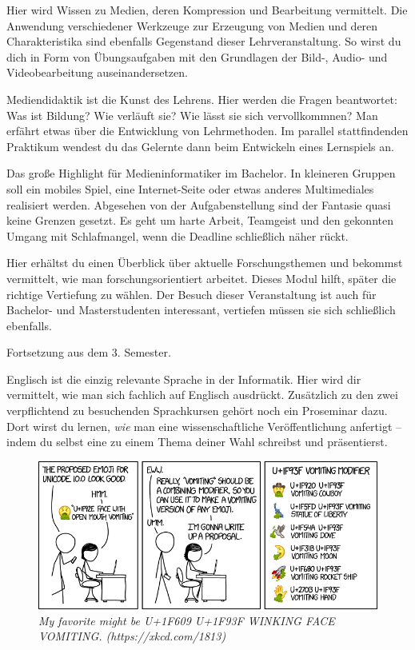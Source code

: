 Hier wird Wissen zu Medien, deren Kompression und Bearbeitung vermittelt.
Die Anwendung verschiedener Werkzeuge zur Erzeugung von Medien und deren Charakteristika sind ebenfalls Gegenstand dieser Lehrveranstaltung.
So wirst du dich in Form von Übungsaufgaben mit den Grundlagen der Bild-, Audio- und Videobearbeitung auseinandersetzen.

Mediendidaktik ist die \glqq Kunst des Lehrens\grqq.
Hier werden die Fragen beantwortet:
Was ist Bildung?
Wie verläuft sie?
Wie lässt sie sich vervollkommnen?
Man erfährt etwas über die Entwicklung von Lehrmethoden.
Im parallel stattfindenden Praktikum wendest du das Gelernte dann beim Entwickeln eines Lernspiels an.

Das große Highlight für Medieninformatiker im Bachelor.
In kleineren Gruppen soll ein mobiles Spiel, eine Internet-Seite oder etwas anderes Multimediales realisiert werden.
Abgesehen von der Aufgabenstellung sind der Fantasie quasi keine Grenzen gesetzt.
Es geht um harte Arbeit, Teamgeist und den gekonnten Umgang mit Schlafmangel, wenn die Deadline schließlich näher rückt.

Hier erhältst du einen Überblick über aktuelle Forschungsthemen und bekommst vermittelt, wie man forschungsorientiert arbeitet.
Dieses Modul hilft, später die richtige Vertiefung zu wählen. Der Besuch dieser Veranstaltung ist auch für Bachelor- und Masterstudenten interessant, vertiefen müssen sie sich schließlich ebenfalls.

Fortsetzung aus dem 3. Semester.

Englisch ist die einzig relevante Sprache in der Informatik.
Hier wird dir vermittelt, wie man sich fachlich auf Englisch ausdrückt. 
Zusätzlich zu den zwei verpflichtend zu besuchenden Sprachkursen gehört noch ein Proseminar dazu.
Dort wirst du lernen, \textit{wie} man eine wissenschaftliche Veröffentlichung anfertigt -- indem du selbst eine zu einem Thema deiner Wahl schreibst und präsentierst.

\begin{figure}[b!]
\centering
\includegraphics[scale=.4]{img/xkcd/vomiting_emoji.png}
\caption*{{\small \textit{My favorite might be U+1F609 U+1F93F WINKING FACE VOMITING. (https://xkcd.com/1813)}}}
\end{figure}

